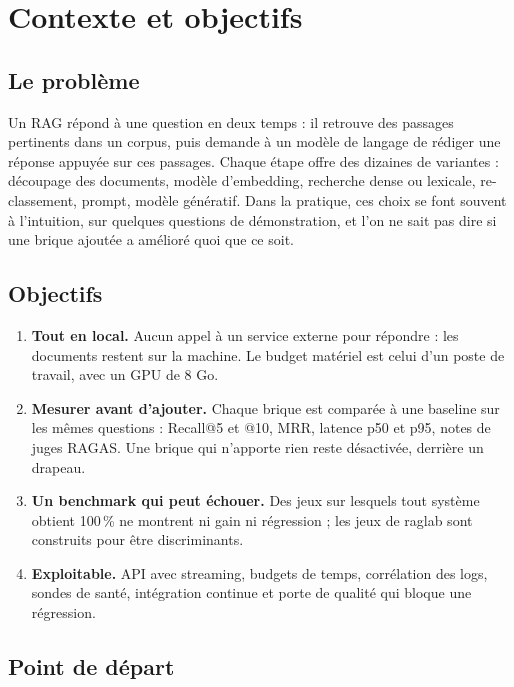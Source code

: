 \documentclass[11pt,a4paper]{article}
\begin{document}
\tableofcontents
\newpage

\section{Contexte et objectifs}

\subsection{Le problème}

Un RAG répond à une question en deux temps : il retrouve des passages pertinents dans un corpus, puis demande à un modèle de langage de rédiger une réponse appuyée sur ces passages. Chaque étape offre des dizaines de variantes : découpage des documents, modèle d'embedding, recherche dense ou lexicale, re-classement, prompt, modèle génératif. Dans la pratique, ces choix se font souvent à l'intuition, sur quelques questions de démonstration, et l'on ne sait pas dire si une brique ajoutée a amélioré quoi que ce soit.

\subsection{Objectifs}

\begin{enumerate}
  \item \textbf{Tout en local.} Aucun appel à un service externe pour répondre : les documents restent sur la machine. Le budget matériel est celui d'un poste de travail, avec un GPU de 8 Go.
  \item \textbf{Mesurer avant d'ajouter.} Chaque brique est comparée à une baseline sur les mêmes questions : Recall@5 et @10, MRR, latence p50 et p95, notes de juges RAGAS. Une brique qui n'apporte rien reste désactivée, derrière un drapeau.
  \item \textbf{Un benchmark qui peut échouer.} Des jeux sur lesquels tout système obtient 100\,\% ne montrent ni gain ni régression ; les jeux de raglab sont construits pour être discriminants.
  \item \textbf{Exploitable.} API avec streaming, budgets de temps, corrélation des logs, sondes de santé, intégration continue et porte de qualité qui bloque une régression.
\end{enumerate}

\subsection{Point de départ}
\end{document}
